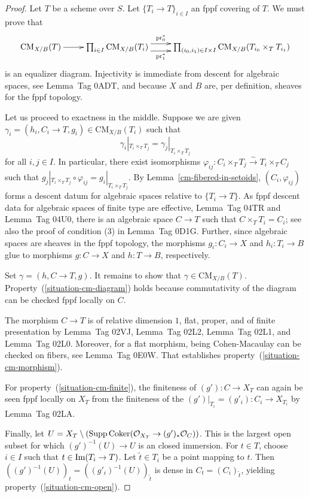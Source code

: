 \documentclass{stacks-project}
\theoremstyle{plain}
\theoremstyle{definition}
\theoremstyle{remark}
\numberwithin{equation}{subsection}
\def\Im{\mathop{\rm Im}}
\def\Coker{\mathop{\rm Coker}}
\def\CMfunctor{\mathcal{C}\!{\it oh}}
\def\CMfunctor{\text{CM}}
\begin{document}
\begin{proof}
Let $T$ be a scheme over $S$.
Let $\{ T_i \to T \}_{i \in I}$ an fppf covering of $T$.
We must prove that
\[ \xymatrix{
  \CMfunctor_{X/B}(T) \ar[r] & \prod\nolimits_{i\in I} \CMfunctor_{X/B}(T_i) \ar@<1ex>[r]^-{\text{pr}_0^*} \ar@<-1ex>[r]_-{\text{pr}_1^*} & \prod\nolimits_{(i_0, i_1) \in I \times I} \CMfunctor_{X/B}(T_{i_0} \times_T T_{i_1})
} \]
is an equalizer diagram.
Injectivity is immediate from descent for algebraic spaces, see Lemma~Tag 0ADT, and because $X$ and $B$ are, per definition, sheaves for the fppf topology.

Let us proceed to exactness in the middle.
Suppose we are given $\gamma_i = (h_i,C_i \to T,g_i) \in \CMfunctor_{X/B}(T_i)$ such that 
\[ \gamma_i|_{T_i \times_T T_j} = \gamma_j|_{T_i \times_T T_j} \]
for all $i,j \in I$.
In particular, there exist isomorphisms $\varphi_{ij} \colon C_i \times_T T_j \xrightarrow{\sim} T_i \times_T C_j$ such that $g_j|_{T_i \times_T T_j} \circ \varphi_{ij} = g_i|_{T_i \times_T T_j}$.
By Lemma~\ref{cm-fibered-in-setoids}, $(C_i,\varphi_{ij})$ forms a descent datum for algebraic spaces relative to $\{T_i \to T\}$.
As fppf descent data for algebraic spaces of finite type are effective, Lemma~Tag 04TR and Lemma~Tag 04U0, there is an algebraic space $C \to T$ such that $C \times_T T_i = C_i$; see also the proof of condition (3) in Lemma~Tag 0D1G.
Further, since algebraic spaces are sheaves in the fppf topology, the morphisms $g_i \colon C_i \to X$ and $h_i \colon T_i \to B$ glue to morphisms $g \colon C \to X$ and $h \colon T \to B$, respectively.

Set $\gamma = (h,C\to T,g)$.
It remains to show that $\gamma \in \CMfunctor_{X/B}(T)$.
Property~(\ref{situation-cm-diagram}) holds because commutativity of the diagram can be checked fppf locally on $C$.

The morphism $C \to T$ is of relative dimension $1$, flat, proper, and of finite presentation by Lemma~Tag 02VJ, Lemma~Tag 02L2, Lemma~Tag 02L1, and Lemma~Tag 02L0.
Moreover, for a flat morphism, being Cohen-Macaulay can be checked on fibers, see Lemma~Tag 0E0W. That establishes property~(\ref{situation-cm-morphism}).

For property~(\ref{situation-cm-finite}), the finiteness of $(g') \colon C \to X_T$ can again be seen fppf locally on $X_T$ from the finiteness of the $(g')|_{T_i} = (g'_i) \colon C_i \to X_{T_i}$ by Lemma~Tag 02LA.

Finally, let $U = X_T \setminus (\text{Supp}\Coker(\mathcal{O}_{X_T} \to (g')_*\mathcal{O}_C))$.
This is the largest open subset for which $(g')^{-1}(U) \to U$ is an closed immersion.
For $t \in T$, choose $i \in I$ such that $t \in \Im(T_i \to T)$.
Let $\tilde{t} \in T_i$ be a point mapping to $t$.
Then $((g')^{-1}(U))_t = ((g'_i)^{-1}(U))_{\tilde{t}}$ is dense in $C_t = (C_{i})_{\tilde{t}}$, yielding property~(\ref{situation-cm-open}).
\end{proof}
\end{document}
